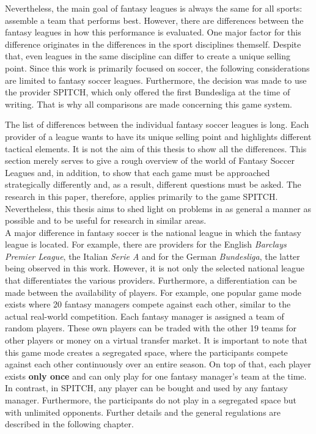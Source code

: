 Nevertheless, the main goal of fantasy leagues is always the same for all sports: assemble a team that performs best. However, there are differences between the fantasy leagues in how this performance is evaluated. One major factor for this difference originates in the differences in the sport disciplines themself. Despite that, even leagues in the same discipline can differ to create a unique selling point. Since this work is primarily focused on soccer, the following considerations are limited to fantasy soccer leagues. Furthermore, the decision was made to use the provider SPITCH, which only offered the first Bundesliga at the time of writing. That is why all comparisons are made concerning this game system. 

The list of differences between the individual fantasy soccer leagues is long. Each provider of a league wants to have its unique selling point and highlights different tactical elements. It is not the aim of this thesis to show all the differences. This section merely serves to give a rough overview of the world of Fantasy Soccer Leagues and, in addition, to show that each game must be approached strategically differently and, as a result, different questions must be asked. The research in this paper, therefore, applies primarily to the game SPITCH. Nevertheless, this thesis aims to shed light on problems in as general a manner as possible and to be useful for research in similar areas. \\
A major difference in fantasy soccer is the national league in which the fantasy league is located. For example, there are providers for the English \emph{Barclays Premier League}, the Italian \emph{Serie A} and for the German \emph{Bundesliga}, the latter being observed in this work. However, it is not only the selected national league that differentiates the various providers. Furthermore, a differentiation can be made between the availability of players. For example, one popular game mode exists where 20 fantasy managers compete against each other, similar to the actual real-world competition. Each fantasy manager is assigned a team of random players. These own players can be traded with the other 19 teams for other players or money on a virtual transfer market. It is important to note that this game mode creates a segregated space, where the participants compete against each other continuously over an entire season. On top of that, each player exists \textbf{only once} and can only play for one fantasy manager's team at the time. In contrast, in SPITCH, any player can be bought and used by any fantasy manager. Furthermore, the participants do not play in a segregated space but with unlimited opponents. Further details and the general regulations are described in the following chapter.